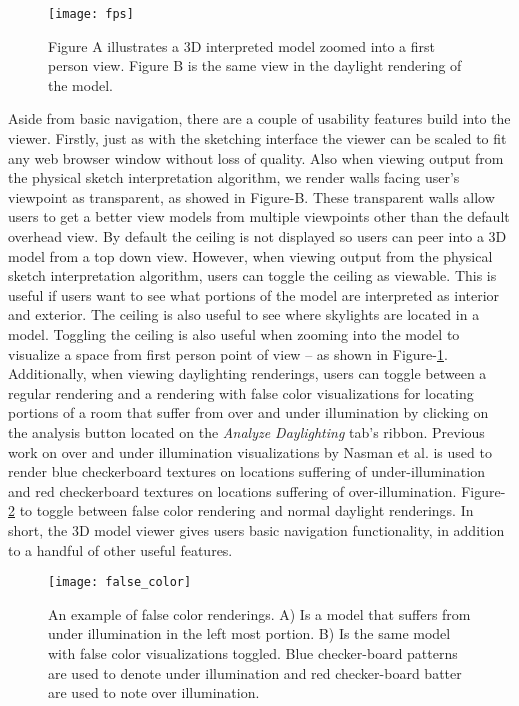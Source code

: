 	\begin{figure}[t]
	\centering
	\texttt{[image: fps]}
	\caption{Figure A illustrates a 3D interpreted model zoomed into a first person view. Figure B is the same view in the daylight rendering of the model.}
	\label{fig:fps}
	\end{figure}

	Aside from basic navigation, there are a couple of usability features build into the viewer.
	Firstly, just as with the sketching interface the viewer can be scaled to fit any web browser window without loss of quality. 
	Also when viewing output from the physical sketch interpretation algorithm, we render walls facing user's viewpoint as transparent, as showed in Figure-\cite{fig:viewer}B. 
	These transparent walls  allow users to get a better view models from multiple viewpoints other than the default overhead view.
	By default the ceiling is not displayed so users can peer into a 3D model from a top down view.
	However, when viewing output from the physical sketch interpretation algorithm, users can toggle the ceiling as viewable. 
	This is useful if users want to see what portions of the model are interpreted as interior and exterior. 
	The ceiling is also useful to see where skylights are located in a model.
	Toggling the ceiling is also useful when zooming into the model to visualize a space from first person point of view -- as shown in Figure-\ref{fig:fps}.
	Additionally, when viewing daylighting renderings, users can toggle between a regular rendering and a rendering with false color visualizations for locating portions of a room that suffer from over and under illumination by clicking on the analysis button located on the \textit{Analyze Daylighting} tab's ribbon.
	Previous work on over and under illumination visualizations by Nasman et al. is used to render blue checkerboard textures on locations suffering of under-illumination and red checkerboard textures on locations suffering of over-illumination\cite{nasman2013physical}.
	Figure-\ref{fig:false_color} to toggle between false color rendering and normal daylight renderings.
	In short, the 3D model viewer gives users basic navigation functionality, in addition to a handful of other useful features.

	\begin{figure}[t]
	\centering
	\texttt{[image: false\_color]}
	\caption{An example of false color renderings. A) Is a model that suffers from under illumination in the left most portion. B) Is the same model with false color visualizations toggled. Blue checker-board patterns are used to denote under illumination and red checker-board batter are used to note over illumination.}
	\label{fig:false_color}
	\end{figure}


